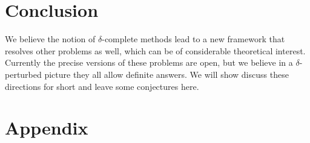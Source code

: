 \documentclass[envcountsect]{llncs}
\begin{document}


\section{Conclusion}


We believe the notion of $\delta$-complete methods lead to a new framework that
resolves other problems as well, which can be of considerable theoretical
interest. Currently the precise versions of these problems are open, but we
believe in a $\delta$-perturbed picture they all allow definite answers. We
will show discuss these directions for short and leave some conjectures here.








\newpage
\section*{Appendix}
\end{document}

